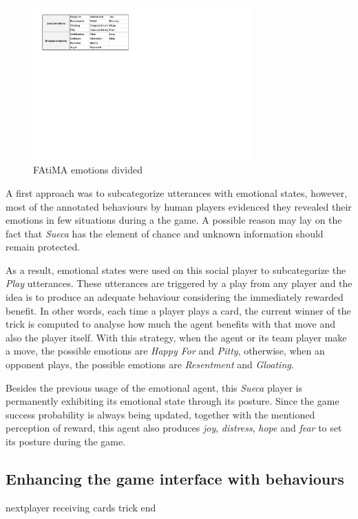 \begin{figure}[ht]
	\centering
    \includegraphics[width=0.75\textwidth]{./img/emotions}
	\caption{FAtiMA emotions divided}
\label{fig:emotions}
\end{figure}

A first approach was to subcategorize utterances with emotional states, however, most of the annotated behaviours by human players evidenced they revealed their emotions in few situations during a the game.
A possible reason may lay on the fact that \emph{Sueca} has the element of chance and unknown information should remain protected.

As a result, emotional states were used on this social player to subcategorize the \emph{Play} utterances.
These utterances are triggered by a play from any player and the idea is to produce an adequate behaviour considering the immediately rewarded benefit.
In other words, each time a player plays a card, the current winner of the trick is computed to analyse how much the agent benefits with that move and also the player itself.
With this strategy, when the agent or its team player make a move, the possible emotions are \emph{Happy For} and \emph{Pitty}, otherwise, when an opponent plays, the possible emotions are \emph{Resentment} and \emph{Gloating}.

Besides the previous usage of the emotional agent, this \emph{Sueca} player is permanently exhibiting its emotional state through its posture.
Since the game success probability is always being updated, together with the mentioned perception of reward, this agent also produces \emph{joy}, \emph{distress}, \emph{hope} and \emph{fear} to set its posture during the game.

\subsection{Enhancing the game interface with behaviours}
nextplayer
receiving cards
trick end